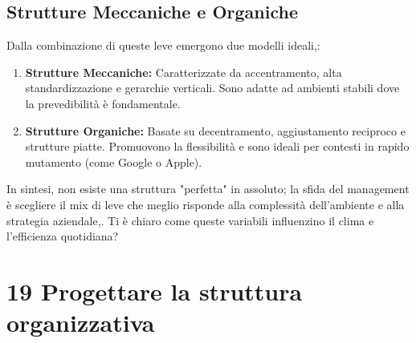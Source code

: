 \documentclass[a4paper,10pt]{article}
\begin{document}
\subsection*{Strutture Meccaniche e Organiche}

Dalla combinazione di queste leve emergono due modelli ideali,:
\begin{enumerate}
    \item \textbf{Strutture Meccaniche:} Caratterizzate da accentramento, alta standardizzazione e gerarchie verticali. Sono adatte ad ambienti stabili dove la prevedibilità è fondamentale.
    \item \textbf{Strutture Organiche:} Basate su decentramento, aggiustamento reciproco e strutture piatte. Promuovono la flessibilità e sono ideali per contesti in rapido mutamento (come Google o Apple).
\end{enumerate}

In sintesi, non esiste una struttura "perfetta" in assoluto; la sfida del management è scegliere il mix di leve che meglio risponde alla complessità dell'ambiente e alla strategia aziendale,. Ti è chiaro come queste variabili influenzino il clima e l'efficienza quotidiana?

\section*{19 Progettare la struttura organizzativa}
\end{document}
